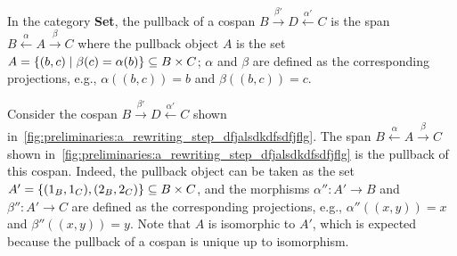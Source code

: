 \begin{example} 
    In the category \textbf{Set},
    the pullback 
    of a cospan \(B \overset{\beta'}{\rightarrow} D \overset{\alpha'}{\leftarrow} C \) is the span \( B \overset{\alpha}{\leftarrow} A \overset{\beta}{\rightarrow} C \) where
    the pullback object $A$ is the set $A = \{(b,c) \mid \beta (c) = \alpha (b)\} \subseteq B \times C$; $\alpha$ and $\beta$ are defined as the corresponding projections, e.g., $\alpha((b, c)) = b$ and $\beta((b, c)) = c$.

    Consider the cospan \(B \overset{\beta'}{\rightarrow} D \overset{\alpha'}{\leftarrow} C \) shown in~\autoref{fig:preliminaries:a_rewriting_step_dfjalsdkdfsdfjflg}. 
    The span \( B \overset{\alpha}{\leftarrow} A \overset{\beta}{\rightarrow} C \) shown in~\autoref{fig:preliminaries:a_rewriting_step_dfjalsdkdfsdfjflg} is the pullback of this cospan.
    Indeed, the pullback object can be taken as the set $A' = \{(1_B,1_C),(2_B,2_C)\} \subseteq B \times C$, and the morphisms $\alpha'' \colon A' \to B$ and $\beta'' \colon A' \to C$ are defined as the corresponding projections, e.g., $\alpha''((x,y)) = x$ and $\beta''((x,y)) = y$. Note that $A$ is isomorphic to $A'$, which is expected because the pullback of a cospan is unique up to isomorphism.
      \begin{figure}[H]
      \centering 
\end{figure}
\end{example}
